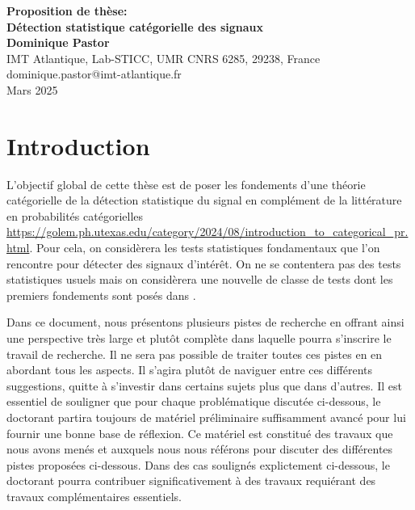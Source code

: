 \documentclass[a4paper, 10pt]{article}
\begin{document}
\begin{center}
\Large \textbf{Proposition de thèse: \\ Détection statistique catégorielle des signaux
}\\[6pt]
\small
\textbf{Dominique Pastor}\\[6pt]
IMT Atlantique, Lab-STICC, UMR CNRS 6285, 29238, France \\ dominique.pastor@imt-atlantique.fr\\[6pt]
Mars 2025
\end{center}

\section{Introduction}

L'objectif global de cette thèse est de poser les fondements d'une théorie catégorielle de la détection statistique du signal en complément de la littérature en probabilités catégorielles \url{https://golem.ph.utexas.edu/category/2024/08/introduction_to_categorical_pr.html}. Pour cela, on considèrera les tests statistiques fondamentaux que l'on rencontre pour détecter des signaux d'intérêt. On ne se contentera pas des tests statistiques usuels mais on considèrera une nouvelle de classe de tests dont les premiers fondements sont posés dans \cite{pastorRandomDistortionTesting2013}. 

Dans ce document, nous présentons plusieurs pistes de recherche en offrant ainsi une perspective très large et plutôt complète dans laquelle pourra s'inscrire le travail de recherche. Il ne sera pas possible de traiter toutes ces pistes en en abordant tous les aspects. Il s'agira plutôt de naviguer entre ces différents suggestions, quitte à s'investir dans certains sujets plus que dans d'autres. Il est essentiel de souligner que pour chaque problématique discutée ci-dessous, le doctorant partira toujours de matériel préliminaire suffisamment avancé pour lui fournir une bonne base de réflexion. Ce matériel est constitué des travaux que nous avons menés et auxquels nous nous référons pour discuter des différentes pistes proposées ci-dessous. Dans des cas soulignés explictement ci-dessous, le doctorant pourra contribuer significativement à des travaux requiérant des travaux complémentaires essentiels.

\end{document}
